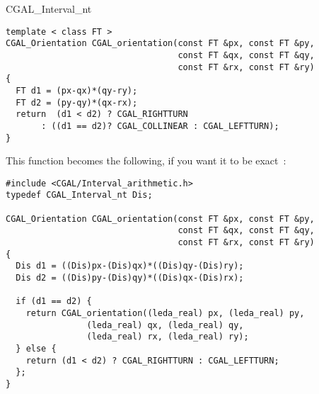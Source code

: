 \begin{ccClass} {CGAL_Interval_nt}
\begin{verbatim}
template < class FT >
CGAL_Orientation CGAL_orientation(const FT &px, const FT &py,
                                  const FT &qx, const FT &qy,
                                  const FT &rx, const FT &ry)
{
  FT d1 = (px-qx)*(qy-ry);
  FT d2 = (py-qy)*(qx-rx);
  return  (d1 < d2) ? CGAL_RIGHTTURN
       : ((d1 == d2)? CGAL_COLLINEAR : CGAL_LEFTTURN);
}
\end{verbatim}

This function becomes the following, if you want it to be exact~:

\begin{verbatim}
#include <CGAL/Interval_arithmetic.h>
typedef CGAL_Interval_nt Dis;

CGAL_Orientation CGAL_orientation(const FT &px, const FT &py,
                                  const FT &qx, const FT &qy,
                                  const FT &rx, const FT &ry)
{
  Dis d1 = ((Dis)px-(Dis)qx)*((Dis)qy-(Dis)ry);
  Dis d2 = ((Dis)py-(Dis)qy)*((Dis)qx-(Dis)rx);

  if (d1 == d2) {
    return CGAL_orientation((leda_real) px, (leda_real) py,
			    (leda_real) qx, (leda_real) qy,
			    (leda_real) rx, (leda_real) ry);
  } else {
    return (d1 < d2) ? CGAL_RIGHTTURN : CGAL_LEFTTURN;
  };
}
\end{verbatim}

\end{ccClass}

